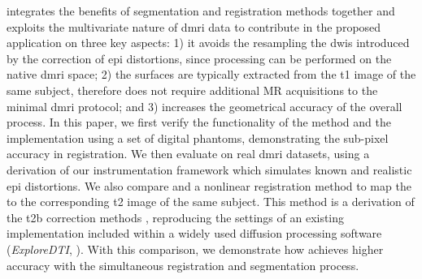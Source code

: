 \Regseg{} integrates the benefits of segmentation and registration methods together and
  exploits the multivariate nature of \gls*{dmri} data to contribute in the proposed
  application on three key aspects:
  1) it avoids the resampling the \glspl*{dwi} introduced by the correction of \gls*{epi}
    distortions, since processing can be performed on the native \gls*{dmri} space;
  2) the surfaces are typically extracted from the \gls*{t1} image of the same subject,
    therefore \regseg{} does not require additional MR acquisitions to the minimal
    \gls*{dmri} protocol; and
  3) \regseg{} increases the geometrical accuracy of the overall process.
In this paper, we first verify the functionality of the method and the \regseg{}
  implementation using a set of digital phantoms, demonstrating the sub-pixel accuracy
  in registration.
We then evaluate \regseg{} on real \gls*{dmri} datasets, using a derivation of our
  instrumentation framework \citep{esteban_simulationbased_2014} which simulates
  known and realistic \gls*{epi} distortions.
We also compare \regseg{} and a nonlinear registration method to map the \lowb{} to
  the corresponding \gls*{t2} image of the same subject.
This method is a derivation of the \gls*{t2b} correction methods \citep{kybic_unwarping_2000},
  reproducing the settings of an existing implementation included within a widely used diffusion
  processing software (\emph{ExploreDTI}, \cite{leemans_exploredti_2009}).
With this comparison, we demonstrate how \regseg{} achieves higher accuracy with the
  simultaneous registration and segmentation process.